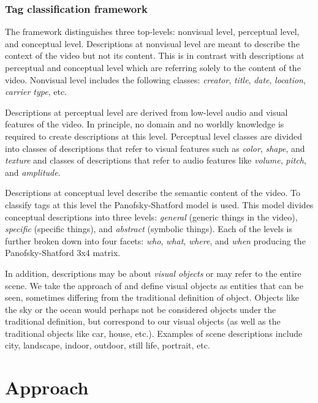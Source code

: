 \subsubsection{Tag classification framework}\label{tag_class_framework}

The framework distinguishes three top-levels: nonvisual level, perceptual
level, and conceptual level. Descriptions at nonvisual level are meant to
describe the context of the video but not its content. This is in contrast
with descriptions at perceptual and conceptual level which are referring
solely to the content of the video. Nonvisual level includes the following
classes: \textit{creator}, \textit{title}, \textit{date}, \textit{location},
\textit{carrier type}, etc.

Descriptions at perceptual level are derived from low-level audio and visual
features of the video. In principle, no domain and no worldly knowledge is
required to create descriptions at this level. Perceptual level classes are
divided into classes of descriptions that refer to visual features such as
\textit{color}, \textit{shape}, and \textit{texture} and classes of
descriptions that refer to audio features like \textit{volume},
\textit{pitch}, and \textit{amplitude}.

Descriptions at conceptual level describe the semantic content of the video.
To classify tags at this level the Panofsky-Shatford model is used. This model
divides conceptual descriptions into three levels: \textit{general} (generic
things in the video), \textit{specific} (specific things), and
\textit{abstract} (symbolic things). Each of the levels is further broken down
into four facets: \textit{who}, \textit{what}, \textit{where}, and
\textit{when} producing the Panofsky-Shatford 3x4 matrix. 

In addition, descriptions may be about \textit{visual objects} or may refer to
the entire scene. We take the approach of \cite{Jaimes00aconceptual} and
define visual objects as entities that can be seen, sometimes differing from
the traditional definition of object. Objects like the sky or the ocean would
perhaps not be considered objects under the traditional definition, but
correspond to our visual objects (as well as the traditional objects like car,
house, etc.). Examples of scene descriptions include city, landscape, indoor,
outdoor, still life, portrait, etc.


\section{Approach}\label{kcap:sec:approach}


